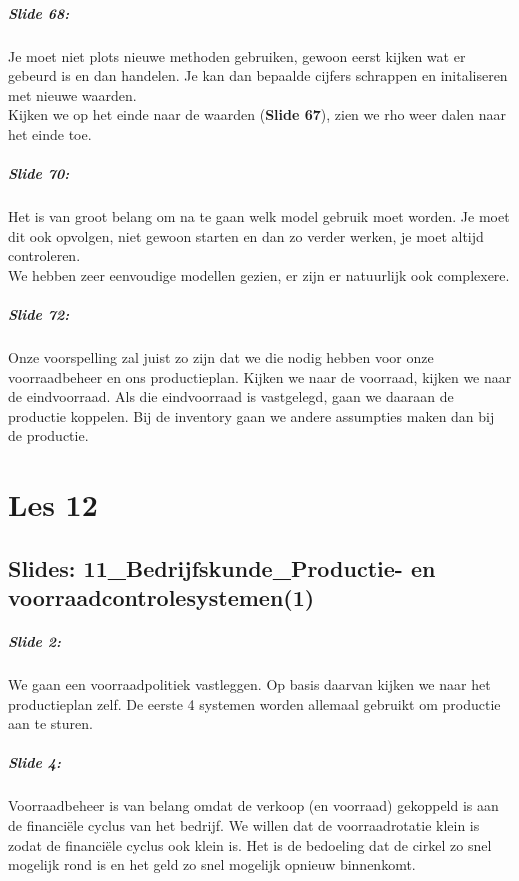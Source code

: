 \documentclass[10pt,a4paper]{report}
\begin{document}
\paragraph{Slide 68:} Je moet niet plots nieuwe methoden gebruiken, gewoon eerst kijken wat er gebeurd is en dan handelen. Je kan dan bepaalde cijfers schrappen en initaliseren met nieuwe waarden.\\
Kijken we op het einde naar de waarden (\textbf{Slide 67}), zien we rho weer dalen naar het einde toe.

\paragraph{Slide 70:} Het is van groot belang om na te gaan welk model gebruik moet worden. Je moet dit ook opvolgen, niet gewoon starten en dan zo verder werken, je moet altijd controleren.\\
We hebben zeer eenvoudige modellen gezien, er zijn er natuurlijk ook complexere. 

\paragraph{Slide 72:} Onze voorspelling zal juist zo zijn dat we die nodig hebben voor onze voorraadbeheer en ons productieplan. Kijken we naar de voorraad, kijken we naar de eindvoorraad. Als die eindvoorraad is vastgelegd, gaan we daaraan de productie koppelen. Bij de inventory gaan we andere assumpties maken dan bij de productie.

\chapter{Les 12}
\section{Slides: 11\_Bedrijfskunde\_Productie- en voorraadcontrolesystemen(1)}

\paragraph{Slide 2:} We gaan een voorraadpolitiek vastleggen. Op basis daarvan kijken we naar het productieplan zelf. De eerste 4 systemen worden allemaal gebruikt om productie aan te sturen. 

\paragraph{Slide 4:} Voorraadbeheer is van belang omdat de verkoop (en voorraad) gekoppeld is aan de financi\"ele cyclus van het bedrijf. We willen dat de voorraadrotatie klein is zodat de financi\"ele cyclus ook klein is. Het is de bedoeling dat de cirkel zo snel mogelijk rond is en het geld zo snel mogelijk opnieuw binnenkomt.
\end{document}
